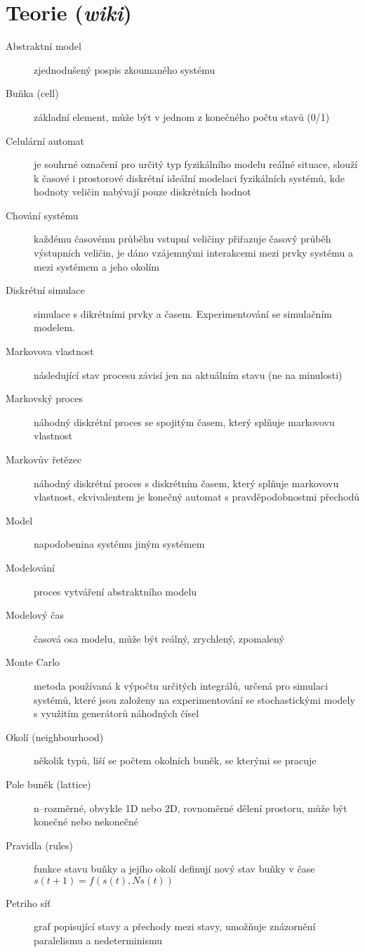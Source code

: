 \documentclass[11pt]{article} %
\begin{document}
\section{Teorie (\textit{wiki})}
\begin{description}
\item[Abstraktní model] zjednodušený pospis zkoumaného systému
\item[Buňka (cell)] základní element, může být v jednom z konečného počtu stavů (0/1)
\item[Celulární automat] je souhrné označení pro určitý typ fyzikálního modelu reálné situace, slouží k časové i prostorové diskrétní ideální modelaci fyzikálních systémů, kde hodnoty veličin nabývají pouze diskrétních hodnot
\item[Chování systému] každému časovému průběhu vstupní veličiny přiřazuje časový průběh výstupních veličin, je dáno vzájemnými interakcemi mezi prvky systému a mezi systémem a jeho okolím
\item[Diskrétní simulace] simulace s dikrétními prvky a časem. Experimentování se simulačním modelem.
\item[Markovova vlastnost] následující stav procesu závisí jen na aktuálním stavu (ne na minulosti)
\item[Markovský proces] náhodný diskrétní proces se spojitým časem, který splňuje markovovu vlastnost
\item[Markovův řetězec] náhodný diskrétní proces s diskrétním časem, který splňuje markovovu vlastnost, ekvivalentem je konečný automat s pravděpodobnostmi přechodů
\item[Model] napodobenina systému jiným systémem
\item[Modelování] proces vytváření abstraktního modelu
\item[Modelový čas] časová osa modelu, může být reálný, zrychlený, zpomalený
\item[Monte Carlo] metoda používaná k výpočtu určitých integrálů, určená pro simulaci systémů, které jsou založeny na experimentování se stochastickými modely s využitím generátorů náhodných čísel
\item[Okolí (neighbourhood)] několik typů, liší se počtem okolních buněk, se kterými se pracuje
\item[Pole buněk (lattice)] n--rozměrné, obvykle 1D nebo 2D, rovnoměrné dělení prostoru, může být konečné nebo nekonečné
\item[Pravidla (rules)] funkce stavu buňky a jejího okolí definují nový stav buňky v čase $s(t + 1) = f(s(t), Ns(t))$
\item[Petriho síť] graf popisující stavy a přechody mezi stavy, umožňuje znázornění paralelismu a nedeterminismu

\end{description}
\end{document}
